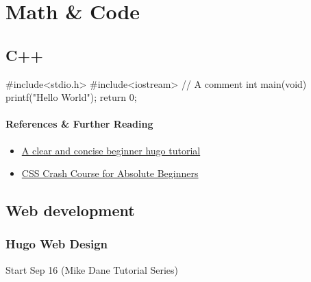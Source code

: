 
\part{Math \& Code}

\chapter{C++}


\begin{cpp}
#include<stdio.h>
#include<iostream>
// A comment
int main(void) {
    printf("Hello World\n");
    return 0;
}
\end{cpp}


\subsection*{References \& Further Reading}
\begin{itemize}
\item
	\href{https://www.linkedin.com/learning/learning-static-site-building-with-hugo-2/build-a-static-site-with-hugo?resume=false}{A clear and concise beginner hugo tutorial}
\item
	\href{https://youtu.be/yfoY53QXEnI}{CSS Crash Course for Absolute Beginners}
\end{itemize}

\chapter{Web development}

\section{Hugo Web Design}

Start Sep 16 (Mike Dane Tutorial Series)

